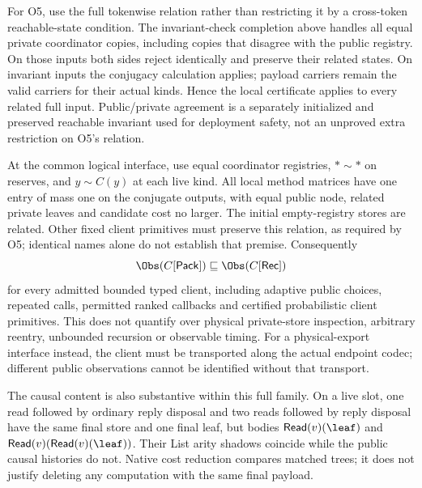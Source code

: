 For O5, use the full tokenwise relation rather than restricting it by a
cross-token reachable-state condition. The invariant-check completion
above handles all equal private coordinator copies, including copies
that disagree with the public registry. On those inputs both sides reject
identically and preserve their related states. On invariant inputs the
conjugacy calculation applies; payload carriers remain the valid carriers
for their actual kinds. Hence the local certificate applies to every
related full input. Public/private agreement is a separately initialized
and preserved reachable invariant used for deployment safety, not an
unproved extra restriction on O5's relation.

At the common logical interface, use equal coordinator registries,
$*\sim*$ on reserves, and $y\sim C(y)$ at each live kind. All local
method matrices have one entry of mass one on the conjugate outputs,
with equal public node, related private leaves and candidate cost no
larger. The initial empty-registry stores are related. Other fixed client
primitives must preserve this relation, as required by O5; identical
names alone do not establish that premise. Consequently
\begin{equation}\label{eq:B-contextual}
\Obs(C[\mathsf{Pack}])\sqsubseteq\Obs(C[\mathsf{Rec}])
\end{equation}
for every admitted bounded typed client, including adaptive public
choices, repeated calls, permitted ranked callbacks and certified
probabilistic client primitives. This does not quantify over physical
private-store inspection, arbitrary reentry, unbounded recursion or
observable timing. For a physical-export interface instead, the client
must be transported along the actual endpoint codec; different public
observations cannot be identified without that transport.

The causal content is also substantive within this full family. On a
live slot, one read followed by ordinary reply disposal and two reads
followed by reply disposal have the same final store and one final leaf,
but bodies $\mathsf{Read}(v)(\leaf)$ and
$\mathsf{Read}(v)(\mathsf{Read}(v)(\leaf))$. Their List arity shadows
coincide while the public causal histories do not. Native cost reduction
compares matched trees; it does not justify deleting any computation
with the same final payload.

